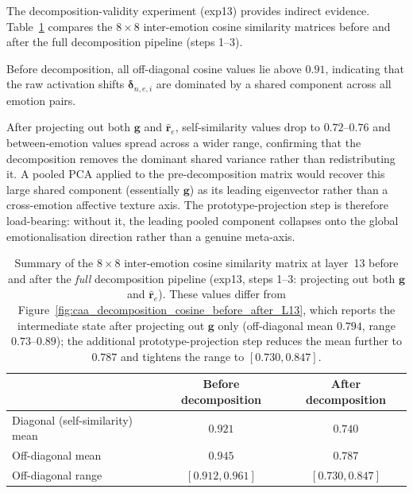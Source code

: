 The decomposition-validity experiment (exp13) provides indirect evidence. Table~\ref{tab:exp13_cosine_comparison} compares the $8 \times 8$ inter-emotion cosine similarity matrices before and after the full decomposition pipeline (steps 1--3). \par

Before decomposition, all off-diagonal cosine values lie above $0.91$, indicating that the raw activation shifts $\boldsymbol{\delta}_{n,e,i}$ are dominated by a shared component across all emotion pairs. \par

After projecting out both $\mathbf{g}$ and $\hat{\mathbf{r}}_e$, self-similarity values drop to $0.72$--$0.76$ and between-emotion values spread across a wider range, confirming that the decomposition removes the dominant shared variance rather than redistributing it. A pooled PCA applied to the pre-decomposition matrix would recover this large shared component (essentially $\mathbf{g}$) as its leading eigenvector rather than a cross-emotion affective texture axis. The prototype-projection step is therefore load-bearing: without it, the leading pooled component collapses onto the global emotionalisation direction rather than a genuine meta-axis.

\begin{table}[H]
\centering
\small
\begin{tabular}{lcc}
\toprule
 & \textbf{Before decomposition} & \textbf{After decomposition} \\
\midrule
Diagonal (self-similarity) mean & $0.921$ & $0.740$ \\
Off-diagonal mean               & $0.945$ & $0.787$ \\
Off-diagonal range              & $[0.912, 0.961]$ & $[0.730, 0.847]$ \\
\bottomrule
\end{tabular}
\caption{Summary of the $8\times8$ inter-emotion cosine similarity matrix at layer~13 before and after the \emph{full} decomposition pipeline (exp13, steps 1--3: projecting out both $\mathbf{g}$ and $\hat{\mathbf{r}}_e$). These values differ from Figure~\ref{fig:caa_decomposition_cosine_before_after_L13}, which reports the intermediate state after projecting out $\mathbf{g}$ only (off-diagonal mean $0.794$, range $0.73$--$0.89$); the additional prototype-projection step reduces the mean further to $0.787$ and tightens the range to $[0.730, 0.847]$.}
\label{tab:exp13_cosine_comparison}
\end{table}

